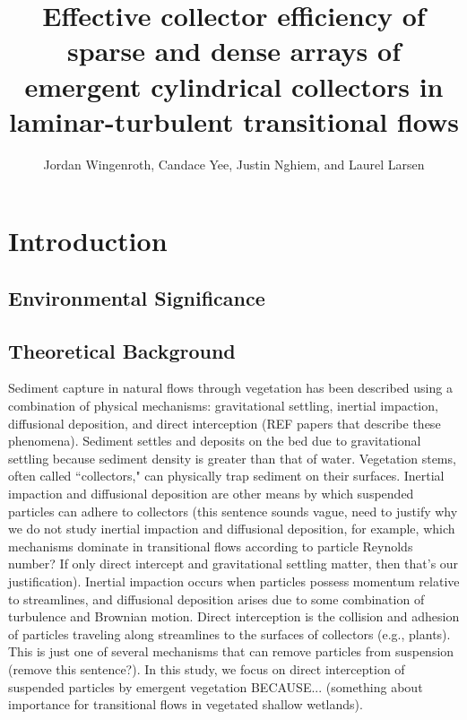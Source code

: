 \documentclass{scrreprt}
\author{Jordan Wingenroth, Candace Yee, Justin Nghiem, and Laurel Larsen}
\title{Effective collector efficiency of sparse and dense arrays of emergent cylindrical collectors in laminar-turbulent transitional flows}
\begin{document}
\maketitle

\chapter{Introduction}

\section{Environmental Significance}

\section{Theoretical Background}

Sediment capture in natural flows through vegetation has been described using a combination of physical mechanisms: gravitational settling, inertial impaction, diffusional deposition, and direct interception (REF papers that describe these phenomena). Sediment settles and deposits on the bed due to gravitational settling because sediment density is greater than that of water. Vegetation stems, often called ``collectors," can physically trap sediment on their surfaces. Inertial impaction and diffusional deposition are other means by which suspended particles can adhere to collectors (this sentence sounds vague, need to justify why we do not study inertial impaction and diffusional deposition, for example, which mechanisms dominate in transitional flows according to particle Reynolds number? If only direct intercept and gravitational settling matter, then that's our justification). Inertial impaction occurs when particles possess momentum relative to streamlines, and diffusional deposition arises due to some combination of turbulence and Brownian motion. Direct interception is the collision and adhesion of particles traveling along streamlines to the surfaces of collectors (e.g., plants). This is just one of several mechanisms that can remove particles from suspension (remove this sentence?). In this study, we focus on direct interception of suspended particles by emergent vegetation BECAUSE... (something about importance for transitional flows in vegetated shallow wetlands).
\end{document}
